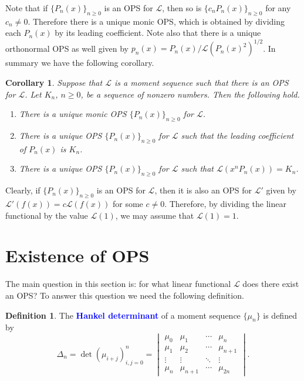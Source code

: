 \documentclass[oneside]{book}
\numberwithin{equation}{section}
\newtheorem{cor}[thm]{Corollary}
\theoremstyle{definition}
\newtheorem{defn}[thm]{Definition}
\newcommand\LL{\mathcal{L}}
\renewcommand\emph[1]{\textcolor{blue}{\bf #1}}
\begin{document}
Note that if \( \{ P_n(x) \}_{n\ge 0} \) is an OPS for \( \LL \), then
so is \( \{ c_nP_n(x) \}_{n\ge 0} \) for any \( c_n\ne 0 \). Therefore
there is a unique monic OPS, which is obtained by dividing each
\( P_n(x) \) by its leading coefficient. Note also that there is a
unique orthonormal OPS as well given by
\( p_n(x) = P_n(x)/\LL(P_n(x)^2)^{1/2} \). In summary we have the following
corollary.

\begin{cor}\label{cor:OPS-unique}
  Suppose that \( \LL \) is a moment sequence such that there is an
  OPS for \( \LL \). Let \( K_n \), \( n\ge0 \), be a sequence of
  nonzero numbers. Then the following hold.
  \begin{enumerate}
  \item There is a unique monic OPS \( \{ P_n(x) \}_{n\ge 0} \) for \( \LL \).
  \item There is a unique OPS \( \{ P_n(x) \}_{n\ge 0} \) for \( \LL \)
    such that the leading coefficient of \( P_n(x) \) is \( K_n \).
  \item There is a unique OPS \( \{ P_n(x) \}_{n\ge 0} \) for \( \LL \)
    such that \( \LL(x^nP_n(x)) = K_n \).
  \end{enumerate}
\end{cor}


Clearly, if \( \{ P_n(x) \}_{n\ge 0} \) is an OPS for \( \LL \), then
it is also an OPS for \( \LL' \) given by
\( \LL'(f(x)) = c \LL(f(x)) \) for some \( c\ne 0 \). Therefore, by
dividing the linear functional by the value \( \LL(1) \), we may
assume that \( \LL(1)=1 \).


\section{Existence of OPS}

The main question in this section is: for what linear functional
\( \LL \) does there exist an OPS? To answer this question we need the
following definition.

\begin{defn}
  The \emph{Hankel determinant} of a moment sequence \( \{\mu_n\} \)
  is defined by
  \[
    \Delta_n = \det(\mu_{i+j})_{i,j=0}^n
    = \begin{vmatrix}
        \mu_0 & \mu_1 & \cdots & \mu_n\\
        \mu_1 & \mu_2 & \cdots & \mu_{n+1}\\
        \vdots & \vdots & \ddots & \vdots\\
        \mu_n & \mu_{n+1} & \cdots & \mu_{2n}
      \end{vmatrix} .
  \]
\end{defn}
\end{document}
